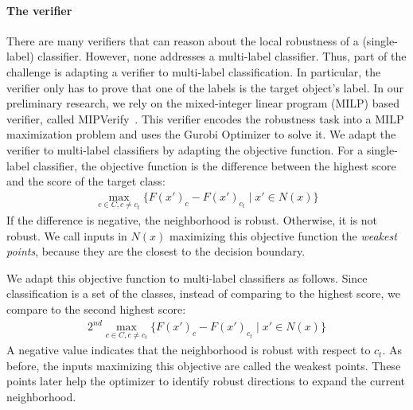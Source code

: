     \paragraph{The verifier}
    There are many verifiers that can reason about the local robustness of a (single-label) classifier.
    However, none addresses a multi-label classifier.
    Thus, part of the challenge is adapting a verifier to multi-label classification.
    In particular, the verifier only has to prove that one of the labels is the target object's label. %
    In our preliminary research, we rely on the mixed-integer linear program (MILP) based verifier, called MIPVerify~\cite{MIPVERIFY}.
    This verifier encodes the robustness task into a MILP maximization problem and uses the Gurobi Optimizer to solve it.
    We adapt the verifier to multi-label classifiers by adapting the objective function.
    For a single-label classifier, the objective function is the difference between the highest score and the score of the target class:
    \begin{gather*}
        \max_{c \in C, c \neq c_{t}}\{F(x')_c- F(x')_{c_{t}}\mid x'\in N(x)\}
    \end{gather*}
    If the difference is negative, the neighborhood is robust. Otherwise, it is not robust.
    We call inputs in $N(x)$ maximizing this objective function the \emph{weakest points}, because they are the closest to the decision boundary.

    We adapt this objective function to multi-label classifiers as follows.
    Since classification is a set of the classes, instead of comparing to the highest score, we compare to the second highest score:
    \begin{gather*}
        2^{nd}\max_{c \in C, c \neq c_{t}}\{F(x')_c- F(x')_{c_{t}}\mid x'\in N(x)\}
    \end{gather*}
    A negative value indicates that the neighborhood is robust with respect to $c_t$.
    As before, the inputs maximizing this objective are called the weakest points.
    These points later help the optimizer to identify robust directions to expand the current neighborhood.
    
